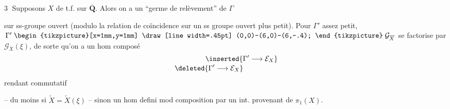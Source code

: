 
\textcircled{3} Supposons $X$ de t.f. sur $\overline{\mathbf Q}$. Alors on a
un ``germe de relèvement'' de $\Gamma$

sur ss-groupe ouvert (modulo la relation
de coïncidence sur un ss groupe
ouvert plus petit). Pour 
$\Gamma'$ assez petit,
 $\Gamma'
\mathrel{\vcenter{\hbox{\begin{tikzpicture}[x=1mm,y=1mm]
\draw[line width=.45pt] (0,0)--(6,0)--(6,-.4);
\end{tikzpicture}}}}
\mathcal G_{\overline X}$ se factorise par $\mathcal G_{\overline X}(\xi)$, de
sorte qu'on a un  hom composé
\[
\begin{gathered}
\hspace{1.6cm}\inserted{\Gamma'\longrightarrow\mathcal E_X}\\[-.2em]
\deleted{\Gamma'\longrightarrow\mathcal E_X}\hspace{1.6cm}
\end{gathered}
\]
rendant commutatif

-- du moins si $\widetilde X=\widetilde X(\xi)$ -- sinon un
hom defini mod composition par un 
int. provenant de $\pi_1(X)$. 
